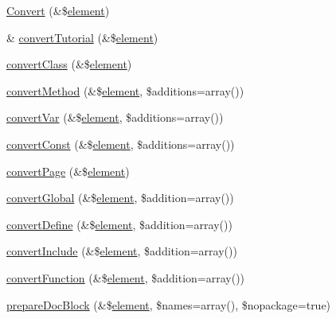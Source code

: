 \begin{DoxyCompactItemize}
\item 
\hyperlink{class_converter_afa6532313547d0b995deebdad0608822}{\-Convert} (\&\$\hyperlink{bug-904820_8php_aa94081298ab2dfd0f261cce6c203d9aa}{element})
\item 
\& \hyperlink{class_converter_a4f6b2fe8a9c935f7b2e917dd651029bf}{convert\-Tutorial} (\&\$\hyperlink{bug-904820_8php_aa94081298ab2dfd0f261cce6c203d9aa}{element})
\item 
\hyperlink{class_converter_afec21ed9dd3b8ac7495c4d6d5741d7af}{convert\-Class} (\&\$\hyperlink{bug-904820_8php_aa94081298ab2dfd0f261cce6c203d9aa}{element})
\item 
\hyperlink{class_converter_a44980dca190087eae9fc5dea1b05bb49}{convert\-Method} (\&\$\hyperlink{bug-904820_8php_aa94081298ab2dfd0f261cce6c203d9aa}{element}, \$additions=array())
\item 
\hyperlink{class_converter_a58ae9f2305e13c314d239ee7adf58547}{convert\-Var} (\&\$\hyperlink{bug-904820_8php_aa94081298ab2dfd0f261cce6c203d9aa}{element}, \$additions=array())
\item 
\hyperlink{class_converter_ae5600f5370cb2989de1cbce759162d7d}{convert\-Const} (\&\$\hyperlink{bug-904820_8php_aa94081298ab2dfd0f261cce6c203d9aa}{element}, \$additions=array())
\item 
\hyperlink{class_converter_a48d30cbead70c887449fda723aa0bb6e}{convert\-Page} (\&\$\hyperlink{bug-904820_8php_aa94081298ab2dfd0f261cce6c203d9aa}{element})
\item 
\hyperlink{class_converter_a0e0a55418e9b2faf79e77efa6e353b7f}{convert\-Global} (\&\$\hyperlink{bug-904820_8php_aa94081298ab2dfd0f261cce6c203d9aa}{element}, \$addition=array())
\item 
\hyperlink{class_converter_ae7820cc5cee4046a3aa73e74b52ce45d}{convert\-Define} (\&\$\hyperlink{bug-904820_8php_aa94081298ab2dfd0f261cce6c203d9aa}{element}, \$addition=array())
\item 
\hyperlink{class_converter_a47191495dbbf21db66447fcbd0e1b1b7}{convert\-Include} (\&\$\hyperlink{bug-904820_8php_aa94081298ab2dfd0f261cce6c203d9aa}{element}, \$addition=array())
\item 
\hyperlink{class_converter_aa666bf1f495fc0b933ff73a307e54b89}{convert\-Function} (\&\$\hyperlink{bug-904820_8php_aa94081298ab2dfd0f261cce6c203d9aa}{element}, \$addition=array())
\item 
\hyperlink{class_converter_ae16467d5497d77e3a6e6f36fe05fadce}{prepare\-Doc\-Block} (\&\$\hyperlink{bug-904820_8php_aa94081298ab2dfd0f261cce6c203d9aa}{element}, \$names=array(), \$nopackage=true)

\end{DoxyCompactItemize}
